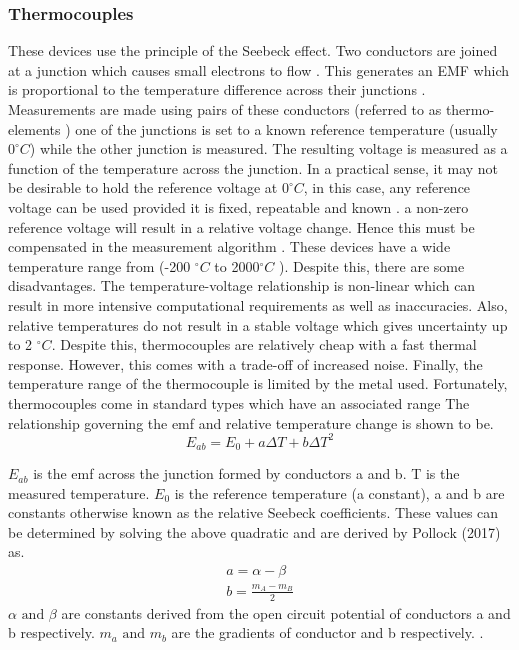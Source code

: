 \subsubsection{Thermocouples}

These devices use the principle of the Seebeck effect. Two conductors are joined at a junction which causes small electrons to flow \cite{pollock2017thermocouples}. This generates an EMF which is proportional to the temperature difference across their junctions \cite{pollock2017thermocouples}. Measurements are made using pairs of these conductors (referred to as thermo-elements \cite{pollock2017thermocouples}) one of the junctions is set to a known reference temperature (usually $0^\circ C$) while the other junction is measured. The resulting voltage is measured as a function of the temperature across the junction. In a practical sense, it may not be desirable to hold the reference voltage at $0^\circ C$, in this case, any reference voltage can be used provided it is fixed, repeatable and known \cite{pollock2017thermocouples}. a non-zero reference voltage will result in a relative voltage change. Hence this must be compensated in the measurement algorithm \cite{pollock2017thermocouples}. These devices have a wide temperature range from (-200 $^\circ C$ to 2000$^\circ C$ \cite{tong2001improving}). Despite this, there are some disadvantages. The temperature-voltage relationship is non-linear \cite{pollock2017thermocouples} \cite{tong2001improving} which can result in more intensive computational requirements as well as inaccuracies. Also, relative temperatures do not result in a stable voltage which gives uncertainty up to 2 $^\circ C$. Despite this, thermocouples are relatively cheap with a fast thermal response. However, this comes with a trade-off of increased noise. Finally, the temperature range of the thermocouple is limited by the metal used. Fortunately, thermocouples come in standard types \cite{tong2001improving} which have an associated range \cite{tong2001improving}
The relationship governing the emf and relative temperature change is shown to be. 
\begin{equation}
    E_{ab} = E_0 + a \Delta T+ b\Delta T^2
\end{equation}

$E_{ab}$ is the emf across the junction formed by conductors a and b. T is the measured temperature. $E_0$ is the reference temperature (a constant),  a and b are constants otherwise known as the relative Seebeck coefficients. These values can be determined by solving the above quadratic and are derived by Pollock (2017) as.
 \begin{subequations}
                 \begin{align}
                     a = \alpha - \beta\\
                     b = \frac{m_A-m_B}{2}
                 \end{align}
 \end{subequations}
 $\alpha \text{ and } \beta$ are constants derived from the open circuit potential of conductors a and b respectively. $m_a\text{ and } m_b$ are the gradients of conductor and b respectively. \cite{pollock2017thermocouples}. 
